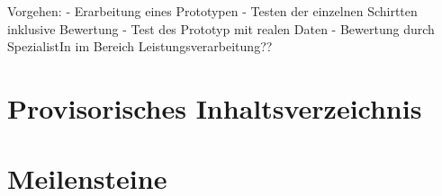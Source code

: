 \documentclass{article}
\begin{document}
Vorgehen:
- Erarbeitung eines Prototypen
- Testen der einzelnen Schirtten inklusive Bewertung
- Test des Prototyp mit realen Daten
- Bewertung durch SpezialistIn im Bereich Leistungsverarbeitung??
 
\section{Provisorisches Inhaltsverzeichnis} 


\section{Meilensteine}


%
%
%
%
 
\end{document}
